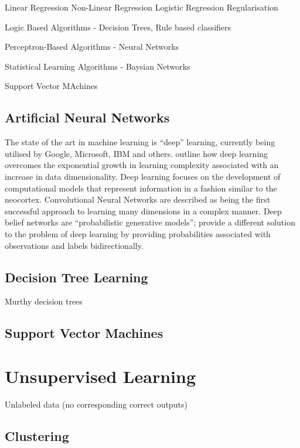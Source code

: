 Linear Regression
Non-Linear Regression
Logistic Regression
Regularisation



Logic Based Algorithms  - Decision Trees, Rule based classifiers

Perceptron-Based Algorithms - Neural Networks

Statistical Learning Algorithms - Baysian Networks

Support Vector MAchines



\subsection{Artificial Neural Networks}

The state of the art in machine learning is “deep” learning, currently being utilised by Google, Microsoft, IBM and others. \cite{arel2010deep} outline how deep learning overcomes the exponential growth in learning complexity associated with an increase in data dimensionality. Deep learning focuses on the development of computational models that represent information in a fashion similar to the neocortex. Convolutional Neural Networks are described as being the first successful approach to learning many dimensions in a complex manner. Deep belief networks are “probabilistic generative models”; provide a different solution to the problem of deep learning by providing probabilities associated with observations and labels bidirectionally.

\subsection{Decision Tree Learning}

Murthy\cite{murthy1998automatic} decision trees

\subsection{Support Vector Machines}

\section{Unsupervised Learning}

Unlabeled data (no corresponding correct outputs)

\subsection{Clustering}

